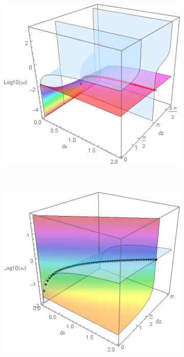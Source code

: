 \documentclass[a4paper,11pt]{article}
\begin{document}
\begin{figure}[!h]
	\begin{subfigure}{0.36\linewidth}
		\includegraphics[width=1\linewidth]{FIGURES/Disp_Full_grav_kz_real.png}
		\caption{}
	\end{subfigure}
	~
	\centering
	\begin{subfigure}{0.36\linewidth}
		\includegraphics[width=1\linewidth]{FIGURES/Disp_Full_grav_kz_imag.png}

\end{subfigure}
\end{figure}
\end{document}

